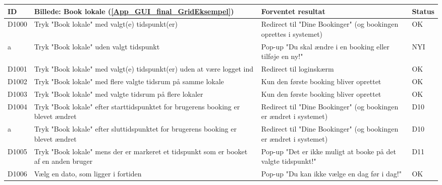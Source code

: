 \begin{tabular}{ |p{0.85cm}| p{5.5cm} | p{8.65cm} | p{1cm} | }
\hline
\textbf{ID} & \textbf{Billede: Book lokale (\ref{App_GUI_final_GridEksempel})}  & \textbf{Forventet resultat} & \textbf{Status}\\ 
\hline
D1000 & Tryk "Book lokale" med valgt(e) tidspunkt(er) & Redirect til "Dine Bookinger" (og bookingen oprettes i systemet) & OK\\
\hline
a & Tryk "Book lokale" uden valgt tidspunkt & Pop-up "Du skal ændre i en booking eller tilføje en ny!" & NYI \\
\hline
D1001 & Tryk "Book lokale" med valgt(e) tidspunkt(er) uden at være logget ind & Redirect til loginskærm  & OK \\
\hline
D1002 & Tryk "Book lokale" med flere valgte tidsrum på samme lokale &  Kun den første booking bliver oprettet & OK\\
\hline
D1003 & Tryk "Book lokale" med valgte tidsrum på flere lokaler &  Kun den første booking bliver oprettet & OK \\
\hline
D1004 & Tryk "Book lokale" efter starttidspunktet for brugerens booking er blevet ændret & Redirect til "Dine Bookinger" (og bookingen er ændret i systemet) & D10\\
\hline
a & Tryk "Book lokale" efter sluttidspunktet for brugerens booking er blevet ændret &Redirect til "Dine Bookinger" (og bookingen er ændret i systemet) & D10 \\
\hline
D1005 & Tryk "Book lokale" mens der er markeret et tidspunkt som er booket af en anden bruger & Pop-up "Det er ikke muligt at booke på det valgte tidspunkt!" & D11 \\
\hline
D1006 & Vælg en dato, som ligger i fortiden & Pop-up "Du kan ikke vælge en dag før i dag!" & OK \\
\hline
\end{tabular}


